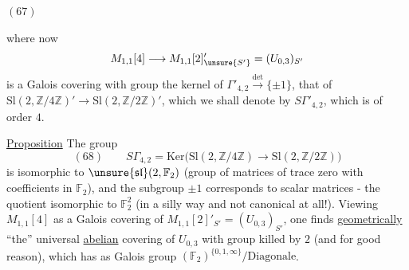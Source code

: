 
\((67)\)

where now
\[
M_{1,1}[4]\longrightarrow M_{1,1}[2]'_{\unsure{S'}}
=(U_{0,3})_{S'}
\]
is a Galois covering with group the kernel of
$\Gamma'_{4,2}\xrightarrow{\det}\{\pm1\}$,
 that of
$\mathrm{Sl}(2,\mathbb Z/4\mathbb Z)'
\longrightarrow\mathrm{Sl}(2,\mathbb Z/2\mathbb Z)'$,
which we shall denote by $S\Gamma'_{4,2}$, which is of order $4$.

\uline{Proposition} The group
\[
(68)\qquad
S\Gamma_{4,2}
=
\mathrm{Ker}\bigl(
\mathrm{Sl}(2,\mathbb Z/4\mathbb Z)
\longrightarrow
\mathrm{Sl}(2,\mathbb Z/2\mathbb Z)
\bigr)
\]
is isomorphic to 
$\unsure{\mathfrak{sl}}(2,\mathbb F_2)$
(group of matrices of trace zero with coefficients in $\mathbb F_2$),
and the subgroup $\pm1$ corresponds to scalar matrices -
the quotient 
isomorphic to  $\mathbb F_2^2$
(in a silly way and not canonical at all!).
Viewing $M_{1,1}[4]$ as a Galois covering of
$M_{1,1}[2]'_{S'}=(U_{0,3})_{S'}$, one finds
\uline{geometrically} ``the'' universal \uline{abelian} covering of
$U_{0,3}$ with group killed by $2$ (and for good reason), which has as
Galois group $(\mathbb F_2)^{\{0,1,\infty\}}/\mathrm{Diagonale}$.

